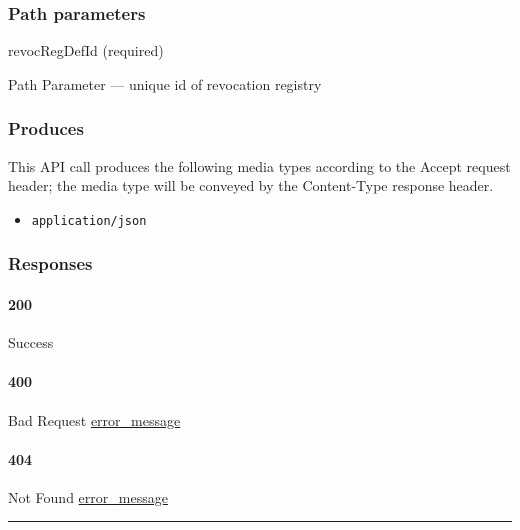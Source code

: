 \hypertarget{path-parameters-56}{%
\subsubsection{Path parameters}\label{path-parameters-56}}

revocRegDefId (required)

{Path Parameter} --- unique id of revocation registry

\hypertarget{produces-106}{%
\subsubsection{Produces}\label{produces-106}}

This API call produces the following media types according to the
{Accept} request header; the media type will be conveyed by the
{Content-Type} response header.

\begin{itemize}
\tightlist
\item
  \texttt{application/json}
\end{itemize}

\hypertarget{responses-109}{%
\subsubsection{Responses}\label{responses-109}}

\hypertarget{section-357}{%
\paragraph{200}\label{section-357}}

Success \protect\hyperlink{}{}

\hypertarget{section-358}{%
\paragraph{400}\label{section-358}}

Bad Request \protect\hyperlink{error_message}{error\_message}

\hypertarget{section-359}{%
\paragraph{404}\label{section-359}}

Not Found \protect\hyperlink{error_message}{error\_message}

\begin{center}\rule{0.5\linewidth}{\linethickness}\end{center}


